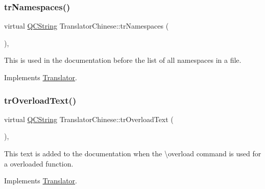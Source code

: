 \mbox{\label{class_translator_chinese_ac4e4e24dc07d2b0e9280afd35a4798f7}} 
\subsubsection{\texorpdfstring{trNamespaces()}{trNamespaces()}}
{\footnotesize\ttfamily virtual \mbox{\hyperlink{class_q_c_string}{Q\+C\+String}} Translator\+Chinese\+::tr\+Namespaces (\begin{DoxyParamCaption}{ }\end{DoxyParamCaption})\hspace{0.3cm}{\ttfamily [inline]}, {\ttfamily [virtual]}}

This is used in the documentation before the list of all namespaces in a file. 

Implements \mbox{\hyperlink{class_translator}{Translator}}.

\mbox{\label{class_translator_chinese_a0d0a783cec6284c5ecc2b44099cfbdad}} 
\subsubsection{\texorpdfstring{trOverloadText()}{trOverloadText()}}
{\footnotesize\ttfamily virtual \mbox{\hyperlink{class_q_c_string}{Q\+C\+String}} Translator\+Chinese\+::tr\+Overload\+Text (\begin{DoxyParamCaption}{ }\end{DoxyParamCaption})\hspace{0.3cm}{\ttfamily [inline]}, {\ttfamily [virtual]}}

This text is added to the documentation when the \textbackslash{}overload command is used for a overloaded function. 

Implements \mbox{\hyperlink{class_translator}{Translator}}.

\mbox{\label{class_translator_chinese_a76e192cdf39ae132fa1d30f757897d58}} 

